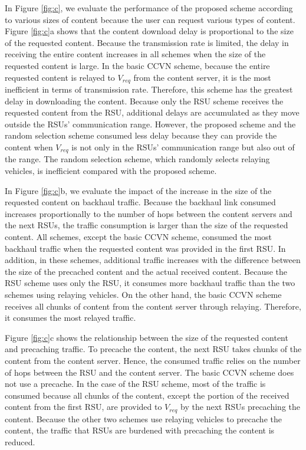 \documentclass[electronics,aricle,accept,pdftex,moreauthors]{Definitions/mdpi}
\begin{document}
In Figure \ref{fig:c}, we evaluate the performance of the proposed scheme according to various sizes of content because the user can request various types of content. Figure \ref{fig:c}a shows that the content download delay is proportional to the size of the requested content. Because the transmission rate is limited, the delay in receiving the entire content increases in all schemes when the size of the requested content is large. In the basic CCVN scheme, because the entire requested content is relayed to ${V}_{req}$ from the content server, it is the most inefficient in terms of transmission rate. Therefore, this scheme has the greatest delay in downloading the content. Because only the RSU scheme receives the requested content from the RSU, additional delays are accumulated as they move outside the RSUs’ communication range. However, the proposed scheme and the random selection scheme consumed less delay because they can provide the content when ${V}_{req}$ is not only in the RSUs’ communication range but also out of the range. The random selection scheme, which randomly selects relaying vehicles, is inefficient compared with the proposed scheme.

In Figure \ref{fig:c}b, we evaluate the impact of the increase in the size of the requested content on backhaul traffic. Because the backhaul link consumed increases proportionally to the number of hops between the content servers and the next RSUs, the traffic consumption is larger than the size of the requested content. All schemes, except the basic CCVN scheme, consumed the most backhaul traffic when the requested content was provided in the first RSU. In addition, in these schemes, additional traffic increases with the difference between the size of the precached content and the actual received content. Because the RSU scheme uses only the RSU, it consumes more backhaul traffic than the two schemes using relaying vehicles. On the other hand, the basic CCVN scheme receives all chunks of content from the content server through relaying. Therefore, it consumes the most relayed traffic.

Figure \ref{fig:c}c shows the relationship between the size of the requested content and precaching traffic. To precache the content, the next RSU takes chunks of the content from the content server. Hence, the consumed traffic relies on the number of hops between the RSU and the content server. The basic CCVN scheme does not use a precache. In the case of the RSU scheme, most of the traffic is consumed because all chunks of the content, except the portion of the received content from the first RSU, are provided to ${V}_{req}$ by the next RSUs precaching the content. Because the other two schemes use relaying vehicles to precache the content, the traffic that RSUs are burdened with precaching the content is reduced.
\end{document}

